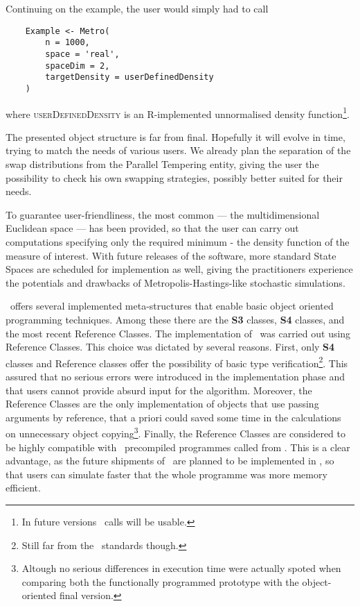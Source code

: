 \documentclass{book}
\begin{document}
Continuing on the example, the user would simply had to call

\begin{lstlisting}
	Example <- Metro(
		n = 1000,
		space = 'real',
		spaceDim = 2,
		targetDensity = userDefinedDensity
	)
\end{lstlisting}  
where \textsc{userDefinedDensity} is an R-implemented unnormalised density function\footnote{In future versions \Cpp\, calls will be usable.}.  

The presented object structure is far from final. Hopefully it will evolve in time, trying to match the needs of various users. We already plan the separation of the swap distributions from the Parallel Tempering entity, giving the user the possibility to check his own swapping strategies, possibly better suited for their needs.


To guarantee user-friendliness, the most common \sspace --- the multidimensional Euclidean space --- has been provided, so that the user can carry out computations specifying only the required minimum - the density function of the measure of interest. With future releases of the software, more standard State Spaces are scheduled for implemention as well, giving the practitioners experience the potentials and drawbacks of Metropolis-Hastings-like stochastic simulations.

\RR\, offers several implemented meta-structures that enable basic object oriented programming techniques. Among these there are the \textbf{S3} classes, \textbf{S4} classes, and the most recent Reference Classes. The implementation of \Metro\, was carried out using Reference Classes. This choice was dictated by several reasons. First, only \textbf{S4} classes and Reference classes offer the possibility of basic type verification\footnote{Still far from the \Cpp\, standards though.}. This assured that no serious errors were introduced in the implementation phase and that users cannot provide absurd input for the algorithm. Moreover, the Reference Classes are the only implementation of objects that use passing arguments by reference, that a priori could saved some time in the calculations on unnecessary object copying\footnote{Altough no serious differences in execution time were actually spoted when comparing both the functionally programmed prototype with the object-oriented final version.}. Finally, the Reference Classes are considered to be highly compatible with \Cpp\, precompiled programmes called from \RR. This is a clear advantage, as the future shipments of \Metro\, are planned to be implemented in \Cpp, so that users can simulate faster that the whole programme was more memory efficient.   

\end{document}
